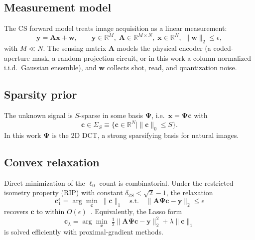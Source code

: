 \documentclass{article}
\begin{document}
\subsection{Measurement model}

The CS forward model treats image acquisition as a linear measurement:
\begin{equation}
  \boldsymbol{y} = \boldsymbol{A}\boldsymbol{x} + \boldsymbol{w},
  \qquad
  \boldsymbol{y} \in \mathbb{R}^M,\;
  \boldsymbol{A} \in \mathbb{R}^{M \times N},\;
  \boldsymbol{x} \in \mathbb{R}^N,\;
  \|\boldsymbol{w}\|_2 \le \epsilon,
  \label{eq:forward}
\end{equation}
with $M \ll N$. The sensing matrix $\boldsymbol{A}$ models the physical encoder (a coded-aperture mask, a random projection circuit, or in this work a column-normalized i.i.d.\ Gaussian ensemble), and $\boldsymbol{w}$ collects shot, read, and quantization noise.

\subsection{Sparsity prior}

The unknown signal is $S$-sparse in some basis $\boldsymbol{\Psi}$, i.e.\ $\boldsymbol{x} = \boldsymbol{\Psi}\boldsymbol{c}$ with
\begin{equation}
  \boldsymbol{c} \in \Sigma_S \equiv \{\boldsymbol{c} \in \mathbb{R}^N \mid \|\boldsymbol{c}\|_0 \le S\}.
\end{equation}
In this work $\boldsymbol{\Psi}$ is the 2D DCT, a strong sparsifying basis for natural images.

\subsection{Convex relaxation}

Direct minimization of the $\ell_0$ count is combinatorial. Under the restricted isometry property (RIP) with constant $\delta_{2S} < \sqrt{2}-1$, the relaxation
\begin{equation}
  \boldsymbol{c}_1^{\epsilon}
  = \arg\min_{\boldsymbol{c}}\;
  \|\boldsymbol{c}\|_1
  \quad \text{s.t.} \quad
  \|\boldsymbol{A}\boldsymbol{\Psi}\boldsymbol{c} - \boldsymbol{y}\|_2 \le \epsilon
  \label{eq:bp-denoise}
\end{equation}
recovers $\boldsymbol{c}$ to within $O(\epsilon)$~\citep{candes2006stable}. Equivalently, the Lasso form
\begin{equation}
  \boldsymbol{c}_\lambda
  = \arg\min_{\boldsymbol{c}}\;
  \tfrac{1}{2}\|\boldsymbol{A}\boldsymbol{\Psi}\boldsymbol{c} - \boldsymbol{y}\|_2^2
  + \lambda \|\boldsymbol{c}\|_1
  \label{eq:lasso}
\end{equation}
is solved efficiently with proximal-gradient methods.
\end{document}
